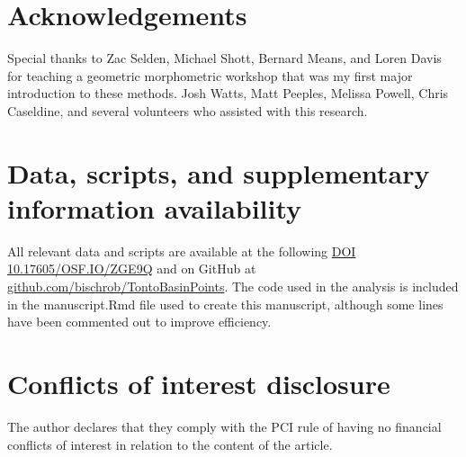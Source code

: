 \documentclass[a4paper]{article}
\begin{document}
\hypertarget{acknowledgements}{%
\section*{Acknowledgements}\label{acknowledgements}}

Special thanks to Zac Selden, Michael Shott, Bernard Means, and Loren Davis for teaching a geometric morphometric workshop that was my first major introduction to these methods. Josh Watts, Matt Peeples, Melissa Powell, Chris Caseldine, and several volunteers who assisted with this research.

\hypertarget{data-scripts-and-supplementary-information-availability}{%
\section*{Data, scripts, and supplementary information availability}\label{data-scripts-and-supplementary-information-availability}}

All relevant data and scripts are available at the following \href{https://osf.io/zge9q/}{DOI 10.17605/OSF.IO/ZGE9Q} and on GitHub at \href{https://github.com/bischrob/TontoBasinPoints}{github.com/bischrob/TontoBasinPoints}. The code used in the analysis is included in the manuscript.Rmd file used to create this manuscript, although some lines have been commented out to improve efficiency.

\hypertarget{conflicts-of-interest-disclosure}{%
\section*{Conflicts of interest disclosure}\label{conflicts-of-interest-disclosure}}

The author declares that they comply with the PCI rule of having no financial conflicts of interest in relation to the content of the article.

\nocite{Oliver1997-lk}

\printbibliography[notcategory=ignore]              %
\end{document}
